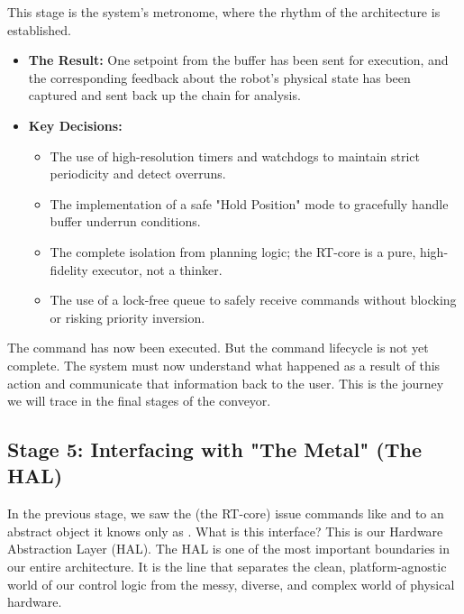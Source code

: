 This stage is the system's metronome, where the rhythm of the architecture is established.
\begin{itemize}
    \item \textbf{The Result:} One setpoint from the buffer has been sent for execution, and the corresponding feedback about the robot's physical state has been captured and sent back up the chain for analysis.
    \item \textbf{Key Decisions:}
    \begin{itemize}
        \item The use of high-resolution timers and watchdogs to maintain strict periodicity and detect overruns.
        \item The implementation of a safe "Hold Position" mode to gracefully handle buffer underrun conditions.
        \item The complete isolation from planning logic; the RT-core is a pure, high-fidelity executor, not a thinker.
        \item The use of a lock-free queue to safely receive commands without blocking or risking priority inversion.
    \end{itemize}
\end{itemize}

The command has now been executed. But the command lifecycle is not yet complete. The system must now understand what happened as a result of this action and communicate that information back to the user. This is the journey we will trace in the final stages of the conveyor.













\subsection{Stage 5: Interfacing with "The Metal" (The HAL)}
\label{subsec:stage5_hal}

In the previous stage, we saw the  (the RT-core) issue commands like  and  to an abstract object it knows only as . What is this interface? This is our Hardware Abstraction Layer (HAL). The HAL is one of the most important boundaries in our entire architecture. It is the line that separates the clean, platform-agnostic world of our control logic from the messy, diverse, and complex world of physical hardware.


